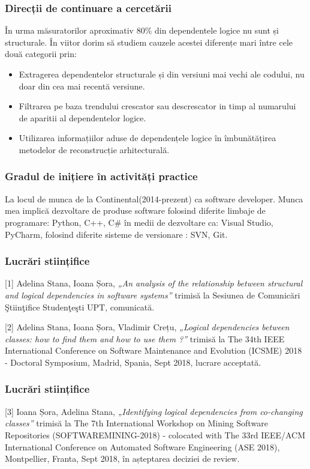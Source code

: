 \documentclass{beamer}
\begin{document}

 \begin{frame}
\frametitle{Direcții de continuare a cercetării}


În urma măsuratorilor aproximativ 80\% din dependentele logice nu sunt și structurale. În viitor dorim să studiem cauzele acestei diferențe mari între cele două categorii prin:
\begin{itemize}
\item Extragerea dependentelor structurale și din versiuni mai vechi ale codului, nu doar din cea mai recentă versiune.
\item Filtrarea pe baza trendului crescator sau descrescator in timp al numarului de aparitii al dependentelor logice.
\item Utilizarea informațiilor aduse de dependențele logice în îmbunătățirea metodelor de reconstrucție arhitecturală.
\end{itemize}

\end{frame}

 \begin{frame}
\frametitle{Gradul de inițiere în activități practice}
\begin{block}{}
La locul de munca de la Continental(2014-prezent) ca software developer.  Munca mea implică dezvoltare de produse software folosind diferite limbaje de programare: Python, C++, C\# în medii de dezvoltare ca: Visual Studio, PyCharm, folosind diferite sisteme de versionare : SVN, Git.
\end{block}
\end{frame}


 \begin{frame}
\frametitle{Lucrări stiințifice}
[1] Adelina Stana, Ioana Șora, \textit{„An analysis of the relationship between structural and logical dependencies in software systems”} trimisă la Sesiunea de Comunicări Ştiinţifice Studenţeşti UPT, comunicată.


[2] Adelina Stana, Ioana Șora, Vladimir Crețu, \textit{„Logical dependencies between classes: how to find them and how to use them ?”} trimisă la The 34th IEEE International Conference on Software Maintenance and Evolution (ICSME) 2018 - Doctoral Symposium, Madrid, Spania, Sept 2018, lucrare acceptată.
\end{frame}


 \begin{frame}
\frametitle{Lucrări stiințifice}
[3] Ioana Șora, Adelina Stana, \textit{„Identifying logical dependencies from co-changing classes”}  trimisă la The 7th International Workshop on Mining Software Repositories (SOFTWAREMINING-2018) - colocated with The 33rd IEEE/ACM International  Conference on Automated Software Engineering (ASE 2018), Montpellier, Franta, Sept 2018, în așteptarea deciziei de review.
\end{frame}



\end{document}
